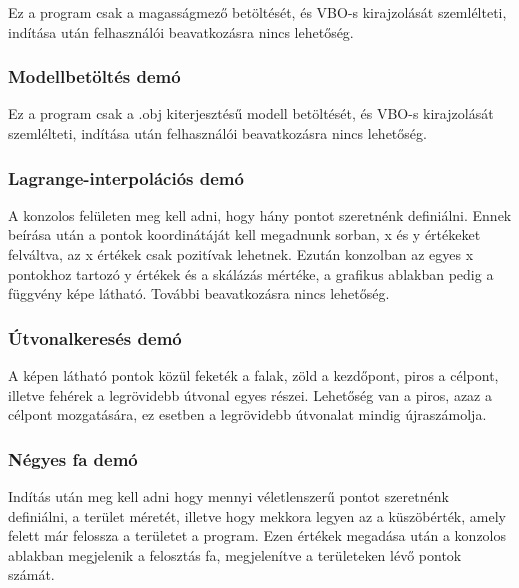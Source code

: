 Ez a program csak a magasságmező betöltését, és VBO-s kirajzolását szemlélteti, indítása után felhasználói beavatkozásra nincs lehetőség.

\subsubsection{Modellbetöltés demó}

Ez a program csak a .obj kiterjesztésű modell betöltését, és VBO-s kirajzolását szemlélteti, indítása után felhasználói beavatkozásra nincs lehetőség.

\subsubsection{Lagrange-interpolációs demó}

A konzolos felületen meg kell adni, hogy hány pontot szeretnénk definiálni. Ennek beírása után a pontok koordinátáját kell megadnunk sorban, x és y értékeket felváltva, az x értékek csak pozitívak lehetnek. Ezután konzolban az egyes x pontokhoz tartozó y értékek és a skálázás mértéke, a grafikus ablakban pedig a függvény képe látható. További beavatkozásra nincs lehetőség.

\subsubsection{Útvonalkeresés demó}

A képen látható pontok közül feketék a falak, zöld a kezdőpont, piros a célpont, illetve fehérek a legrövidebb útvonal egyes részei. Lehetőség van a piros, azaz a célpont mozgatására, ez esetben a legrövidebb útvonalat mindig újraszámolja.

\subsubsection{Négyes fa demó}

Indítás után meg kell adni hogy mennyi véletlenszerű pontot szeretnénk definiálni, a terület méretét, illetve hogy mekkora legyen az a küszöbérték, amely felett már felossza a területet a program. Ezen értékek megadása után a konzolos ablakban megjelenik a felosztás fa, megjelenítve a területeken lévő pontok számát.